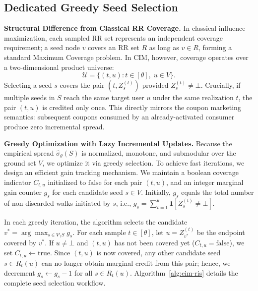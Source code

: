 \documentclass[sigconf]{acmart}
\begin{document}
\subsection{Dedicated Greedy Seed Selection}
\label{sec:greedy-selection}

\textbf{Structural Difference from Classical RR Coverage.}
In classical influence maximization, each sampled RR set represents an
independent coverage requirement; a seed node $v$ covers an RR set $R$ as long
as $v \in R$, forming a standard Maximum Coverage problem.
In CIM, however, coverage operates over a two-dimensional product universe:
\[
  \mathcal{U} = \bigl\{(t, u) : t \in [\theta],\; u \in V\bigr\}.
\]
Selecting a seed $s$ covers the pair $(t, Z_s^{(t)})$ provided $Z_s^{(t)} \ne \bot$.
Crucially, if multiple seeds in $S$ reach the same target user $u$ under the
same realization $t$, the pair $(t, u)$ is credited only once.
This directly mirrors the coupon marketing semantics: subsequent coupons
consumed by an already-activated consumer produce zero incremental spread.

\textbf{Greedy Optimization with Lazy Incremental Updates.}
Because the empirical spread $\hat{\sigma}_\theta(S)$ is normalized, monotone,
and submodular over the ground set $V$, we optimize it via greedy selection.
To achieve fast iterations, we design an efficient gain tracking mechanism.
We maintain a boolean coverage indicator $C_{t,u}$ initialized to $\mathrm{false}$
for each pair $(t, u)$, and an integer marginal gain counter $g_s$ for each
candidate seed $s \in V$.
Initially, $g_s$ equals the total number of non-discarded walks initiated by $s$,
i.e., $g_s = \sum_{t=1}^\theta \mathbf{1}[Z_s^{(t)} \ne \bot]$.

In each greedy iteration, the algorithm selects the candidate $v^* = \arg\max_{s \in V \setminus S} g_s$.
For each sample $t \in [\theta]$, let $u = Z_{v^*}^{(t)}$ be the endpoint covered
by $v^*$.
If $u \ne \bot$ and $(t, u)$ has not been covered yet ($C_{t,u} = \mathrm{false}$),
we set $C_{t,u} \gets \mathrm{true}$.
Since $(t, u)$ is now covered, any other candidate seed $s \in R_t(u)$ can no
longer obtain marginal credit from this pair; hence, we decrement $g_s \gets g_s - 1$
for all $s \in R_t(u)$.
Algorithm~\ref{alg:cim-ris} details the complete seed selection workflow.
\end{document}

